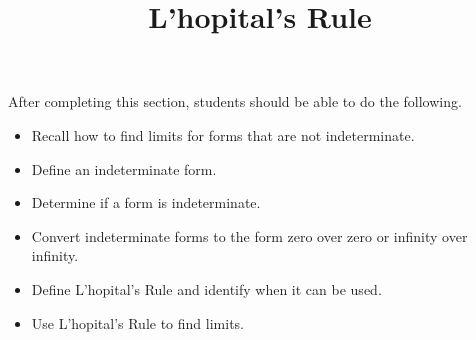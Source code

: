 \documentclass{ximera}
\title{L'hopital's Rule}
\begin{document}
\begin{abstract}
\end{abstract}

\maketitle

\begin{sectionOutcomes}

After completing this section, students should be able to do the following.

\begin{itemize}
	\item Recall how to find limits for forms that are not indeterminate.
	\item Define an indeterminate form.
	\item Determine if a form is indeterminate.
	\item Convert indeterminate forms to the form zero over zero
          or infinity over infinity.
	\item Define L'hopital's Rule and identify when it can be used.
	\item Use L'hopital's Rule to find limits.
\end{itemize}

\end{sectionOutcomes}
\end{document}
